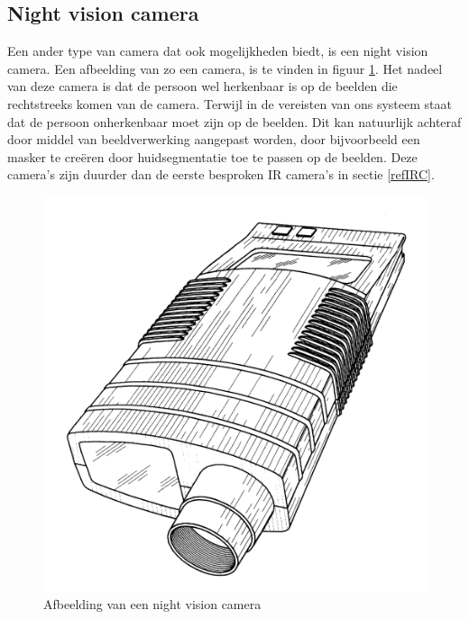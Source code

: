 \subsection{Night vision camera}
\label{refNVC}
Een ander type van camera dat ook mogelijkheden biedt, is een night vision camera. Een afbeelding van zo een camera, is te vinden in figuur \ref{imgNVC}\cite{bibNVC}. Het nadeel van deze camera is dat de persoon wel herkenbaar is op de beelden die rechtstreeks komen van de camera. Terwijl in de vereisten van ons systeem staat dat de persoon onherkenbaar moet zijn op de beelden. Dit kan natuurlijk achteraf door middel van beeldverwerking aangepast worden, door bijvoorbeeld een masker te cre\"eren door huidsegmentatie toe te passen op de beelden. Deze camera's zijn duurder dan de eerste besproken IR camera's in sectie \ref{refIRC}.
\begin{figure}[hbp]
	\includegraphics[scale=0.075]{NightVisionCamera}
	\caption{Afbeelding van een night vision camera}
	\label{imgNVC}
\end{figure}

